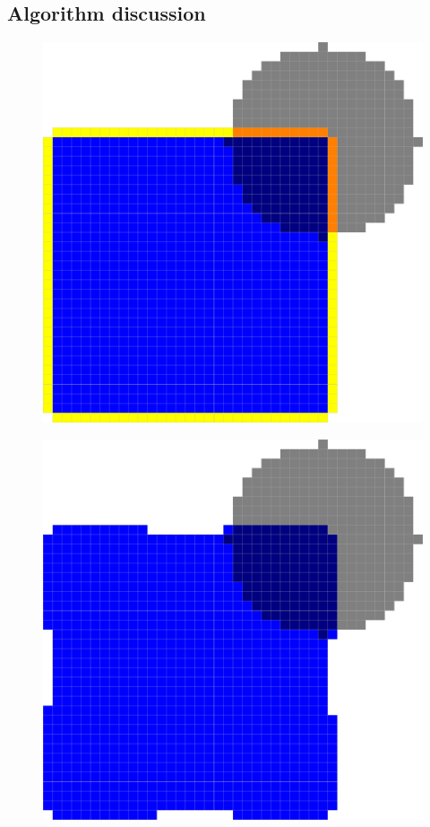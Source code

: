 \subsection{Algorithm discussion}
\label{ch6:subsec:flipflow-algorithm-discussion}

\begin{figure}
\begin{minipage}{0.49\textwidth}
\center
\includegraphics[scale=0.15]{figures/chapter6/contour-information/before-opt.pdf}
\label{ch6:fig:contour-info-1}
\end{minipage}%
\begin{minipage}{0.49\textwidth}
\center
\includegraphics[scale=0.15]{figures/chapter6/contour-information/after-opt.pdf}

\end{minipage}
\end{figure}
